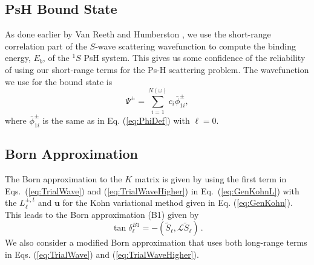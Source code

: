 \documentclass[preprint,showpacs,showkeys,preprintnumbers,amsmath,amssymb,longbibliography,pra,aps]{revtex4-1}
\begin{document}

\subsection{PsH Bound State}
As done earlier by Van Reeth and Humberston \cite{VanReeth2003,VanReeth2004},
we use the short-range correlation part of the $S$-wave scattering wavefunction
to compute the binding energy, $E_b$, of the $^1S$ PsH system. This gives us
some confidence of the reliability of using our short-range terms for the Ps-H 
scattering problem. The wavefunction we use for the bound state is
\begin{equation}
\label{eq:BoundWavefn}
\Psi^\pm = \sum_{i=1}^{N(\omega)} c_i \bar{\phi}_{1i}^\pm,
\end{equation}
where $\bar{\phi}_{1i}^\pm$ is the same as in Eq. (\ref{eq:PhiDef}) with
$\ell = 0$.

\subsection{Born Approximation}
The Born approximation to the $K$ matrix \cite{Bransden2003} is given by
using the first term in Eqs.~(\ref{eq:TrialWave}) and
(\ref{eq:TrialWaveHigher}) in Eq.~(\ref{eq:GenKohnL}) with the $L^{\pm,t}_\ell$
and $\textbf{u}$ for the Kohn variational method given in Eq. (\ref{eq:GenKohn}).
This leads to the Born approximation (B1) given by
\begin{equation}
\label{eq:Born}
\tan\delta_\ell^{B1} = -(\widetilde{S}_\ell,\mathcal{L}\widetilde{S}_\ell )\,.
\end{equation}
We also consider a modified Born approximation that uses both long-range terms
in Eqs. (\ref{eq:TrialWave}) and (\ref{eq:TrialWaveHigher}).
\end{document}
